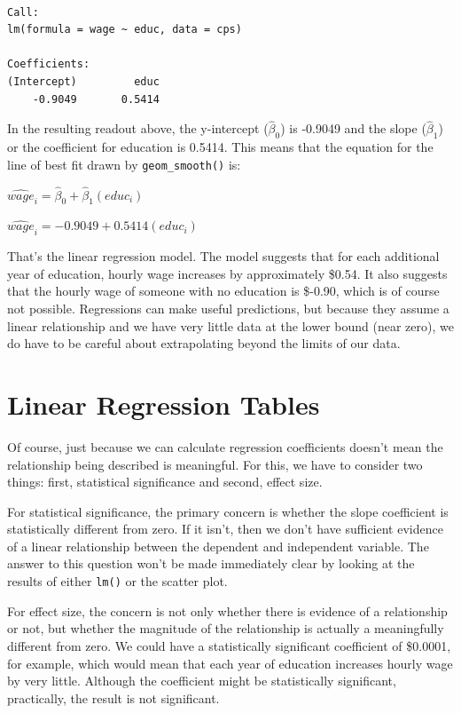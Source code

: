 \documentclass[
  letterpaper,
]{book}
\begin{document}
\begin{verbatim}

Call:
lm(formula = wage ~ educ, data = cps)

Coefficients:
(Intercept)         educ  
    -0.9049       0.5414  
\end{verbatim}

In the resulting readout above, the y-intercept (\(\hat{\beta}_{0}\)) is
-0.9049 and the slope (\(\hat{\beta}_{1}\)) or the coefficient for
education is 0.5414. This means that the equation for the line of best
fit drawn by \texttt{geom\_smooth()} is:

\(\widehat{wage}_{i} = \hat{\beta}_{0} + \hat{\beta}_{1}({educ}_{i})\)

\(\widehat{wage}_{i} = -0.9049 + 0.5414({educ}_{i})\)

That's the linear regression model. The model suggests that for each
additional year of education, hourly wage increases by approximately
\$0.54. It also suggests that the hourly wage of someone with no
education is \$-0.90, which is of course not possible. Regressions can
make useful predictions, but because they assume a linear relationship
and we have very little data at the lower bound (near zero), we do have
to be careful about extrapolating beyond the limits of our data.

\hypertarget{linear-regression-tables}{%
\section{Linear Regression Tables}\label{linear-regression-tables}}

Of course, just because we can calculate regression coefficients doesn't
mean the relationship being described is meaningful. For this, we have
to consider two things: first, statistical significance and second,
effect size.

For statistical significance, the primary concern is whether the slope
coefficient is statistically different from zero. If it isn't, then we
don't have sufficient evidence of a linear relationship between the
dependent and independent variable. The answer to this question won't be
made immediately clear by looking at the results of either \texttt{lm()}
or the scatter plot.

For effect size, the concern is not only whether there is evidence of a
relationship or not, but whether the magnitude of the relationship is
actually a meaningfully different from zero. We could have a
statistically significant coefficient of \$0.0001, for example, which
would mean that each year of education increases hourly wage by very
little. Although the coefficient might be statistically significant,
practically, the result is not significant.
\end{document}
